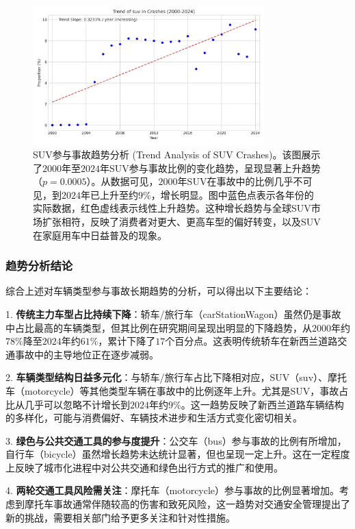 \documentclass[12pt,a4paper]{article}
\begin{document}
\begin{figure}[H]
\centering
\includegraphics[width=0.8\textwidth]{trend_suv.png}
\caption{SUV参与事故趋势分析 (Trend Analysis of SUV Crashes)。该图展示了$2000$年至$2024$年SUV参与事故比例的变化趋势，呈现显著上升趋势（$p = 0.0005$）。从数据可见，$2000$年SUV在事故中的比例几乎不可见，到$2024$年已上升至约$9\%$，增长明显。图中蓝色点表示各年份的实际数据，红色虚线表示线性上升趋势。这种增长趋势与全球SUV市场扩张相符，反映了消费者对更大、更高车型的偏好转变，以及SUV在家庭用车中日益普及的现象。}
\label{fig:trend_suv}
\end{figure}

\subsubsection{趋势分析结论}

综合上述对车辆类型参与事故长期趋势的分析，可以得出以下主要结论：

1.  \textbf{传统主力车型占比持续下降}：轿车/旅行车（carStationWagon）虽然仍是事故中占比最高的车辆类型，但其比例在研究期间呈现出明显的下降趋势，从$2000$年约$78\%$降至$2024$年约$61\%$，累计下降了$17$个百分点。这表明传统轿车在新西兰道路交通事故中的主导地位正在逐步减弱。

2.  \textbf{车辆类型结构日益多元化}：与轿车/旅行车占比下降相对应，SUV（suv）、摩托车（motorcycle）等其他类型车辆在事故中的比例逐年上升。尤其是SUV，事故占比从几乎可以忽略不计增长到$2024$年约$9\%$。这一趋势反映了新西兰道路车辆结构的多样化，可能与消费偏好、车辆技术进步和生活方式变化密切相关。

3.  \textbf{绿色与公共交通工具的参与度提升}：公交车（bus）参与事故的比例有所增加，自行车（bicycle）虽然增长趋势未达统计显著，但也呈现一定上升。这在一定程度上反映了城市化进程中对公共交通和绿色出行方式的推广和使用。

4.  \textbf{两轮交通工具风险需关注}：摩托车（motorcycle）参与事故的比例显著增加。考虑到摩托车事故通常伴随较高的伤害和致死风险，这一趋势对交通安全管理提出了新的挑战，需要相关部门给予更多关注和针对性措施。
\end{document}
